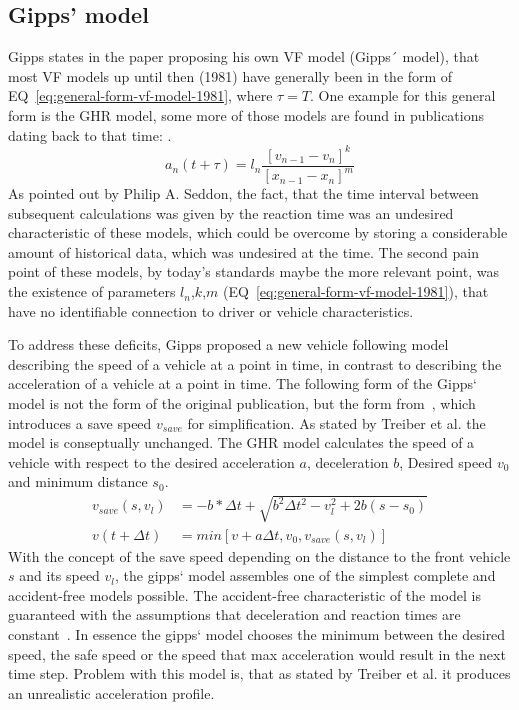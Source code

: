         \subsection{Gipps' model}\label{subsec:gipps-model}
            Gipps states in the paper proposing his own VF model (Gipps´ model), that most VF models up until then (1981) have generally been in the form of EQ~\ref{eq:general-form-vf-model-1981}, where $\tau = T$.
            One example for this general form is the GHR model, some more of those models are found in publications dating back to that time: \cite{newell1961nonlinear, lee1966generalization, bender1970flow}.
            \begin{equation}
                a_n(t+\tau) = l_n \frac{[v_{n-1} - v_n]^k}{[x_{n-1} - x_n]^m}\label{eq:general-form-vf-model-1981}
            \end{equation}
            As pointed out by Philip A. Seddon, the fact, that the time interval between subsequent calculations was given by the reaction time was an undesired characteristic of these models\cite{seddon1972program}, which could be overcome by storing a considerable amount of historical data, which was undesired at the time.
            The second pain point of these models, by today's standards maybe the more relevant point, was the existence of parameters $l_n$,$k$,$m$ (EQ~\ref{eq:general-form-vf-model-1981}), that have no identifiable connection to driver or vehicle characteristics\cite{gipps1981behavioural}.

            To address these deficits, Gipps proposed a new vehicle following model describing the speed of a vehicle at a point in time, in contrast to describing the acceleration of a vehicle at a point in time.
            The following form of the Gipps` model is not the form of the original publication, but the form from~\cite{treiber2013traffic}, which introduces a save speed $v_{save}$ for simplification.
            As stated by Treiber et al. the model is conseptually unchanged.
            The GHR model calculates the speed of a vehicle with respect to the desired acceleration $a$, deceleration $b$, Desired speed $v_0$ and minimum distance $s_0$.
            \begin{align}
                v_{save} (s, v_l) &= -b*\Delta t + \sqrt{b^2 \Delta t^2 - v_l^2 + 2b (s-s_0)} \\
                v(t+ \Delta t) &= min[v+a\Delta t, v_0, v_{save}(s,v_l)] \label{eq:gipps-model-simplified}
            \end{align}
            With the concept of the save speed depending on the distance to the front vehicle $s$ and its speed $v_l$, the gipps` model assembles one of the simplest complete %
            and accident-free models possible.
            The accident-free characteristic of the model is guaranteed with the assumptions that deceleration and reaction times are constant~\cite{treiber2013traffic}.
            In essence the gipps` model chooses the minimum between the desired speed, the safe speed or the speed that max acceleration would result in the next time step.
            Problem with this model is, that as stated by Treiber et al. it produces an unrealistic acceleration profile.

